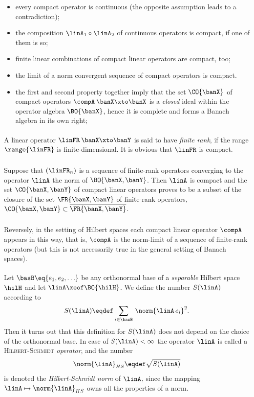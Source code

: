\documentclass[11pt,twoside]{article}
\begin{document}
\begin{itemize}[leftmargin=17pt]
\item[(a)]
every compact operator is continuous
(the opposite assumption leads to a contradiction);

\item[(b)]
the composition $\linA_1 \circ \linA_2$ of continuous operators is compact,
if one of them is so;

\item[(c)]
finite linear combinations of compact linear operators are compact, too;

\item[(d)]
the limit of a norm convergent sequence of compact operators is compact.

\item[(e)]
the first and second property together imply that
the set $\CO{\banX}$ of compact operators $\compA\:\banX \xto \banX$
is a \textit{closed} ideal within the operator algebra $\BO{\banX} $,
hence it is complete and forms a Banach algebra in its own right;
\end{itemize}

\paragraph{} %
A linear operator $\linFR \: \banX \xto \banY$ is said
to have \textit{finite rank},
if the range $\range{\linFR}$ is finite-dimensional.
It is obvious that $\linFR$ is compact.

\subparagraph{}
Suppose that $(\linFR_n)$ is a sequence of finite-rank operators
converging to the operator $\linA$ {\wrt} the norm of $\BO{\banX,\banY}$.
Then $\linA$ is compact
and the set $\CO{\banX,\banY}$ of compact linear operators
proves to be a subset of the closure of the set $\FR{\banX,\banY}$
of finite-rank operators,
{\ie}
$\CO{\banX,\banY} \subset \overline{\FR{\banX,\banY}}$.

\subparagraph{}
Reversely,
in the setting of Hilbert spaces 
each compact linear operator $\compA$ appears in this way,
that is,
$\compA$ is the norm-limit of a sequence of finite-rank operators
(but this is not necessarily true in the general setting of Banach spaces).

\paragraph{} %
Let $\basB \eq \{e_1,e_2,\ldots\}$ be any orthonormal base
of a \textit{separable} Hilbert space $\hilH$ and let $\linA \xeof \BO{\hilH}$.
We define the number $S(\linA)$ according to
\[
S(\linA) \eqdef \sum_{i \in \basB} \, \norm{ \linA \, e_i}^2.
\]
Then it turns out that this definition for $S(\linA)$
does not depend on the choice of the orthonormal base.
In case of $S(\linA) < \infty$
the operator $\linA$ is called a \textsc{Hilbert-Schmidt} \textit{operator},
and the number
\[
\norm{\linA}_{HS} \eqdef \sqrt{S(\linA)}
\]
is denoted the \textit{Hilbert-Schmidt} \textit{norm} of $\linA$,
since the mapping $\linA \mapsto \norm{\linA}_{HS} $
owns all the properties of a norm.
\end{document}
